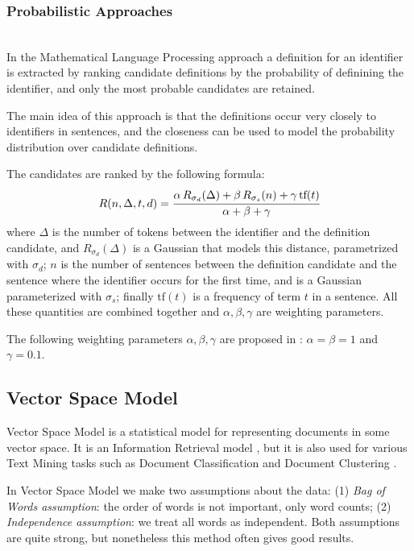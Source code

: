 \subsubsection{Probabilistic Approaches} \label{sec:mlp} \ \\

In the Mathematical Language Processing approach \cite{pagael2014mlp}
a definition for an identifier is extracted by ranking
candidate definitions by the probability of definining
the identifier, and only the most probable candidates are retained.

The main idea of this approach is that the definitions occur very closely
to identifiers in sentences, and the closeness can be used to
model the probability distribution over candidate definitions.

The candidates are ranked by the following formula:
$$R(n, \Delta, t, d) = \cfrac{\alpha \, R_{\sigma_d}(\Delta) + \beta \, R_{\sigma_s}(n) + \gamma \, \text{tf}(t)}{\alpha + \beta + \gamma}$$
where $\Delta$ is the number of tokens between the identifier and the definition
candidate, and $R_{\sigma_d}(\Delta)$ is a Gaussian that models this distance, parametrized
with $\sigma_d$; $n$ is the number of sentences between the definition candidate
and the sentence where the identifier occurs for the first time, and is a Gaussian
parameterized with $\sigma_s$; finally $\text{tf}(t)$ is a frequency of term $t$
in a sentence. All these quantities are combined together and $\alpha, \beta, \gamma$ are weighting parameters.

The following weighting parameters $\alpha, \beta, \gamma$ are proposed in
\cite{pagael2014mlp}: $\alpha = \beta = 1$ and $\gamma = 0.1$.



\subsection{Vector Space Model} \label{sec:vsm}

Vector Space Model is a statistical model for representing documents
in some vector space. It is an Information Retrieval
model \cite{manning2008introduction}, but it is also used for various
Text Mining tasks such as Document Classification \cite{sebastiani2002machine}
and Document Clustering \cite{oikonomakou2005review} \cite{aggarwal2012survey}.

In Vector Space Model we make two assumptions about the data:
(1) \emph{Bag of Words assumption}: the order of words is not important,
only word counts;
(2) \emph{Independence assumption}: we treat all words as independent.
Both assumptions are quite strong, but nonetheless this method often
gives good results.


